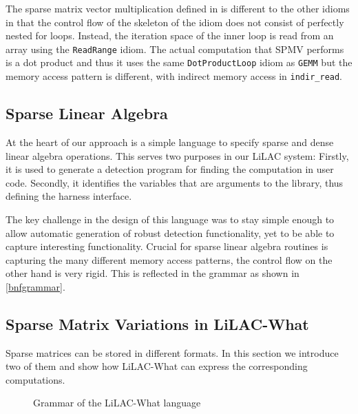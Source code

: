     The sparse matrix vector multiplication defined in  is
    different to the other idioms in that
    the control flow of the skeleton of the idiom does not consist of perfectly
    nested for loops.
    Instead, the iteration space of the inner loop is read from an array using
    the \texttt{ReadRange} idiom.
    The actual computation that SPMV performs is a dot product and thus it uses
    the same \texttt{DotProductLoop} idiom as
    \texttt{GEMM} but the memory access pattern is different, with indirect
    memory access in \texttt{indir\_read}.

\subsection{Sparse Linear Algebra}
At the heart of our approach is a simple language to specify sparse and dense
linear algebra operations.
This serves two purposes in our LiLAC system: Firstly, it is used to generate
a detection program for finding the computation in user code.
Secondly, it identifies the variables that are arguments to the library, thus
defining the harness interface.

The key challenge in the design of this language was to stay simple enough
to allow automatic generation of robust detection functionality, yet to be able
to capture interesting functionality.
Crucial for sparse linear algebra routines is capturing the many different
memory access patterns, the control flow on the other hand is very rigid.
This is reflected in the grammar as shown in \autoref{bnfgrammar}.

\subsection{Sparse Matrix Variations in LiLAC-What}
Sparse matrices can be stored in different formats.
In this section we introduce two of them and show how LiLAC-What can express
the corresponding computations.

\begin{figure}[t]

\vspace{-1.5em}
\caption{Grammar of the LiLAC-What language}
\label{bnfgrammar}
\end{figure}

